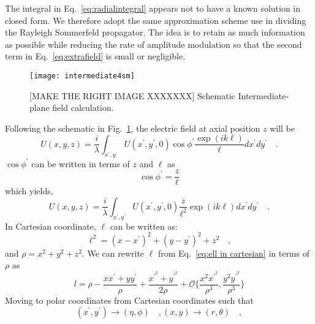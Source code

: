 The integral in Eq.~\eqref{eq:radialintegral} appears not to have a known solution in closed form. We therefore adopt the same approximation scheme use in dividing the Rayleigh Sommerfeld propagator.
The idea is to retain as much information
as possible while reducing the rate of amplitude modulation so that the second term 
in Eq.~\eqref{eq:extrafield} is small or negligible.

\begin{figure}[t!]
  \centering
  \texttt{[image: intermediate4sm]}
  \caption{[MAKE THE RIGHT IMAGE XXXXXXX] Schematic Intermediate-plane field calculation.}
  \label{fig:intermediate field schema}
\end{figure}
Following the schematic in Fig.~\ref{fig:intermediate field schema}, 
the electric field at axial position $z$ will be
\begin{equation}
\label{eq:intermediate field a}
U(x,y,z) = \frac{i}{\lambda}\int _{x^{\prime},y^{\prime}}U(x^{\prime},y^{\prime},0)
					\cos \phi ^{\prime} \frac{\exp 
					\left( ik\ell \right)}{\ell}dx^{\prime}dy^{\prime} \quad .
\end{equation}
$\cos\phi ^{\prime}$ can be written in terms of $z$ and $\ell$ as 
\begin{equation}
\cos \phi ^{\prime} = \frac{z}{\ell}
\end{equation}
which yields,
\begin{equation}
\label{eq:intermediate field b}
U(x,y,z) = \frac{i}{\lambda}\int _{x^{\prime},y^{\prime}}U(x^{\prime},y^{\prime},0)
					\frac{z}{\ell ^2} \exp 
					\left( ik\ell \right)dx^{\prime}dy^{\prime} \quad .
\end{equation}
In Cartesian coordinate, $\ell$ can be written as:
\begin{equation}
\label{eq:ell in cartesian}
\ell ^2 = (x-x^{\prime})^{2} + (y-y^{\prime})^{2} + z^{2} \quad ,
\end{equation}
and $\rho = x^2 + y^2 + z^2$. We can rewrite $\ell$ from 
Eq.~\eqref{eq:ell in cartesian} in terms of $\rho$ as 
\begin{equation}
\label{eq:ell in r}
l = \rho - \frac{xx^{\prime}+yy^{\prime}}{\rho} + \frac{x^{\prime^{2}} + y^{\prime^{2}}}{2\rho}
			+ \mathcal{O}\lbrace \frac{x^2x^{\prime ^{2}}}{\rho ^3},\frac{y^2y^{\prime ^{2}}}{\rho ^3} \rbrace
\end{equation}
Moving to polar coordinates from Cartesian coordinates such that
\begin{subequations}
\begin{equation}
\left( x^{\prime},y^{\prime}\right) \longrightarrow \left( \eta , \phi \right) \quad ,
\end{equation}
\begin{equation}
 \left( x,y\right) \longrightarrow \left(r , \theta \right) \quad ,
\end{equation}
\end{subequations}
